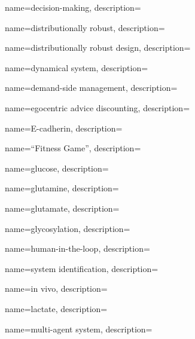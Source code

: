 
	{
		name={decision-making},
		description={}
	}

	{
		name={distributionally robust},
		description={}
	}
	
	{
		name={distributionally robust design},
		description={}
	}
	
	{
		name={dynamical system},
		description={}
	}		
	
	{
		name={demand-side management},
		description={}
	}			


	{
		name={egocentric advice discounting},
		description={}
	}

	{
		name={E-cadherin},
		description={}
	}



	{
		name={``Fitness Game''},
		description={}
	}


	{
		name={glucose},
		description={}
	}
	
	{
		name={glutamine},
		description={}
	}	
	
	{
		name={glutamate},
		description={}
	}		


	{
		name={glycosylation},
		description={}
	}	


	{
		name={human-in-the-loop},
		description={}
	}
	

	{
		name={system identification},
		description={}
	}

	{
		name={in vivo},		
		description={}
	}
	

	{
		name={lactate},
		description={}
	}	
	

	{
		name={multi-agent system},
		description={}
	}	



